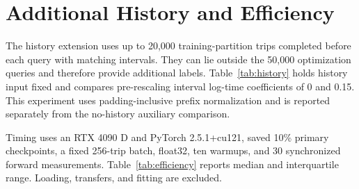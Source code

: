 \documentclass[journal]{IEEEtran}
\begin{document}
\section{Additional History and Efficiency}


The history extension uses up to 20,000 training-partition trips completed before each query with matching intervals. They can lie outside the 50,000 optimization queries and therefore provide additional labels. Table~\ref{tab:history} holds history input fixed and compares pre-rescaling interval log-time coefficients of 0 and 0.15. This experiment uses padding-inclusive prefix normalization and is reported separately from the no-history auxiliary comparison.

Timing uses an RTX 4090 D and PyTorch 2.5.1+cu121, saved 10\% primary checkpoints, a fixed 256-trip batch, float32, ten warmups, and 30 synchronized forward measurements. Table~\ref{tab:efficiency} reports median and interquartile range. Loading, transfers, and fitting are excluded.



\end{document}
